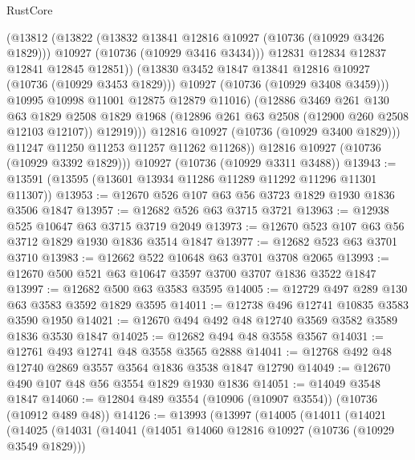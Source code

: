 \begin{lexlean}{RustCore}
\begin{coremodule}
                      (@13812
                        (@13822
                          (@13832 @13841 @12816 @10927 (@10736 (@10929 @3426 @1829)))
                          @10927
                          (@10736 (@10929 @3416 @3434)))
                        @12831
                        @12834
                        @12837
                        @12841
                        @12845
                        @12851))
                    (@13830 @3452 @1847 @13841 @12816 @10927 (@10736 (@10929 @3453 @1829)))
                    @10927
                    (@10736 (@10929 @3408 @3459)))
                  @10995
                  @10998
                  @11001
                  @12875
                  @12879
                  @11016)
                (@12886
                  @3469
                  @261
                  @130
                  @63
                  @1829
                  @2508
                  @1829
                  @1968
                  (@12896 @261 @63 @2508 (@12900 @260 @2508 @12103 @12107))
                  @12919)))
            @12816
            @10927
            (@10736 (@10929 @3400 @1829)))
          @11247
          @11250
          @11253
          @11257
          @11262
          @11268))
      @12816
      @10927
      (@10736 (@10929 @3392 @1829)))
    @10927
    (@10736 (@10929 @3311 @3488))
@13943 := @13591 (@13595 (@13601 @13934 @11286 @11289 @11292 @11296 @11301 @11307))
@13953 := @12670 @526 @107 @63 @56 @3723 @1829 @1930 @1836 @3506 @1847
@13957 := @12682 @526 @63 @3715 @3721
@13963 := @12938 @525 @10647 @63 @3715 @3719 @2049
@13973 := @12670 @523 @107 @63 @56 @3712 @1829 @1930 @1836 @3514 @1847
@13977 := @12682 @523 @63 @3701 @3710
@13983 := @12662 @522 @10648 @63 @3701 @3708 @2065
@13993 := @12670 @500 @521 @63 @10647 @3597 @3700 @3707 @1836 @3522 @1847
@13997 := @12682 @500 @63 @3583 @3595
@14005 := @12729 @497 @289 @130 @63 @3583 @3592 @1829 @3595
@14011 := @12738 @496 @12741 @10835 @3583 @3590 @1950
@14021 := @12670 @494 @492 @48 @12740 @3569 @3582 @3589 @1836 @3530 @1847
@14025 := @12682 @494 @48 @3558 @3567
@14031 := @12761 @493 @12741 @48 @3558 @3565 @2888
@14041 := @12768 @492 @48 @12740 @2869 @3557 @3564 @1836 @3538 @1847 @12790
@14049 := @12670 @490 @107 @48 @56 @3554 @1829 @1930 @1836
@14051 := @14049 @3548 @1847
@14060 := @12804 @489 @3554 (@10906 (@10907 @3554)) (@10736 (@10912 @489 @48))
@14126 := @13993
    (@13997
      (@14005
        (@14011
          (@14021
            (@14025
              (@14031
                (@14041
                  (@14051 @14060 @12816 @10927 (@10736 (@10929 @3549 @1829)))

\end{coremodule}
\end{lexlean}
